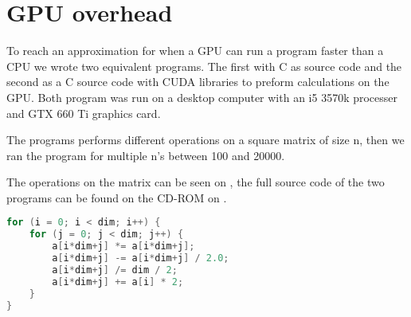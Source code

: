 \chapter{GPU overhead}
\label{app:gpuoverhead}
To reach an approximation for when a GPU can run a program faster than a CPU  we wrote two equivalent programs.
The first with C as source code and the second as a C source code with CUDA libraries to preform calculations on the GPU.
Both program was run on a desktop computer with an i5 3570k processer and GTX 660 Ti graphics card.

The programs performs different operations on a square matrix of size n, then we ran the program for multiple n's between 100 and 20000.

The operations on the matrix can be seen on , the full source code of the two programs can be found on the CD-ROM on .

\begin{lstlisting}[language=C,caption={Operations on the matrix},label=gpuoversource,frame=single]
for (i = 0; i < dim; i++) {
	for (j = 0; j < dim; j++) {
		a[i*dim+j] *= a[i*dim+j];
		a[i*dim+j] -= a[i*dim+j] / 2.0;
		a[i*dim+j] /= dim / 2;
		a[i*dim+j] += a[i] * 2;
	}
}
\end{lstlisting}

